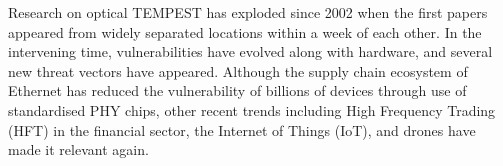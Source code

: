 Research on optical TEMPEST has exploded since 2002 when the first papers
appeared from widely separated locations within a week of each other. In the
intervening time, vulnerabilities have evolved along with hardware, and
several new threat vectors have appeared. Although the supply chain ecosystem
of Ethernet has reduced the vulnerability of billions of devices through use
of standardised PHY chips, other recent trends including High Frequency
Trading (HFT) in the financial sector, the Internet of Things (IoT), and
drones have made it relevant again.

